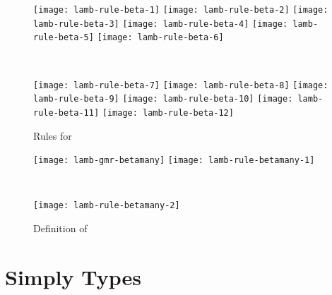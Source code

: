 \documentclass[master.tex]{subfiles}
\begin{document}
\begin{figure}[H]
    \centering

\begin{minipage}{0.48\textwidth}
\begin{flushleft}
\texttt{[image: lamb-rule-beta-1]}
\texttt{[image: lamb-rule-beta-2]}
\texttt{[image: lamb-rule-beta-3]}
\texttt{[image: lamb-rule-beta-4]}
\texttt{[image: lamb-rule-beta-5]}
\texttt{[image: lamb-rule-beta-6]}
\end{flushleft}
\end{minipage}
~
\begin{minipage}{0.48\textwidth}
\begin{flushright}
\texttt{[image: lamb-rule-beta-7]}
\texttt{[image: lamb-rule-beta-8]}
\texttt{[image: lamb-rule-beta-9]}
\texttt{[image: lamb-rule-beta-10]}
\texttt{[image: lamb-rule-beta-11]}
\texttt{[image: lamb-rule-beta-12]}
\end{flushright}
\end{minipage}

    \caption{Rules for }
\label{fig:prop-rule-main-rules}
\end{figure}


\begin{figure}[H]
    \centering
\begin{minipage}{0.48\textwidth}
\begin{flushleft}
\texttt{[image: lamb-gmr-betamany]}
\texttt{[image: lamb-rule-betamany-1]}
\end{flushleft}
\end{minipage}
~
\begin{minipage}{0.48\textwidth}
\begin{flushright}
\texttt{[image: lamb-rule-betamany-2]}
\end{flushright}
\end{minipage}

\caption{Definition of }
\end{figure}

\section{Simply Types}
\end{document}
